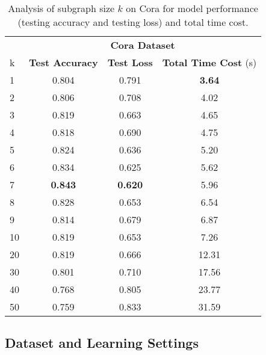 \documentclass{article}
\begin{document}
\begin{table}[t]
\caption{Analysis of subgraph size $k$ on Cora for model performance (testing accuracy and testing loss) and total time cost.}\label{tab:k_analysis}
 \small
\centering
\setlength{\tabcolsep}{6pt}
\begin{tabular}{|l|c|c|c|}
\hline
 & \multicolumn{3}{|c|}{\textbf{Cora Dataset}} \\
\cline{2-4}
{k }& {\textbf{Test Accuracy}} & {\textbf{Test Loss}} & {\textbf{Total Time Cost} (s)} \\
\hline 
\hline 
1&0.804  &0.791  &\textbf{3.64}   \\
\cline{2-4}
2&0.806  &0.708  &4.02   \\
\cline{2-4}
3&0.819  &0.663  &4.65   \\
\cline{2-4}
4&0.818&0.690  &4.75   \\
\cline{2-4}
5&0.824  &0.636  &5.20   \\
\cline{2-4}
6&0.834 &0.625  &5.62   \\
\cline{2-4}
7&\textbf{0.843} &\textbf{0.620}  &5.96   \\
\cline{2-4}
8&0.828  &0.653  &6.54   \\
\cline{2-4}
9&0.814  &0.679  &6.87   \\
\cline{2-4}
10&0.819 &0.653  &7.26   \\
\cline{2-4}
20&0.819 &0.666  &12.31   \\
\cline{2-4}
30&0.801 &0.710  &17.56   \\
\cline{2-4}
40&0.768 &0.805  &23.77   \\
\cline{2-4}
50&0.759 &0.833  &31.59   \\
\hline
\end{tabular}
\end{table}


\subsection{Dataset and Learning Settings}
\end{document}
